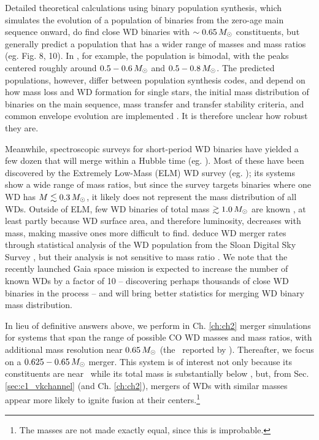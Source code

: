 Detailed theoretical calculations using binary population synthesis, which simulates the evolution of a population of binaries from the zero-age main sequence onward, do find close WD binaries with $\sim0.65\,\Msun$ constituents, but generally predict a population that has a wider range of masses and mass ratios (eg. \citealt{toon+14} Fig. 8, 10).  In \cite{toonnp12}, for example, the population is bimodal, with the peaks centered roughly around $0.5-0.6\,\Msun$ and $0.5-0.8\,\Msun$.  The predicted populations, however, differ between population synthesis codes, and depend on how mass loss and WD formation for single stars, the initial mass distribution of binaries on the main sequence, mass transfer and transfer stability criteria, and common envelope evolution are implemented \citep{toon+14, clae+14}.  It is therefore unclear how robust they are.

Meanwhile, spectroscopic surveys for short-period WD binaries have yielded a few dozen that will merge within a Hubble time (eg. \citealt{mars11, gian+15}).  Most of these have been discovered by the Extremely Low-Mass (ELM) WD survey (eg. \citealt{brow+10, gian+15}); its systems show a wide range of mass ratios, but since the survey targets binaries where one WD has $M\lesssim 0.3\,\Msun$, it likely does not represent the mass distribution of all WDs.  Outside of ELM, few WD binaries of total mass $\gtrsim1.0\,\Msun$ are known \citep{napi+07, mars11}, at least partly because WD surface area, and therefore luminosity, decreases with mass, making massive ones more difficult to find.  \cite{badem12} deduce WD merger rates through statistical analysis of the WD population from the Sloan Digital Sky Survey \citep{york+00}, but their analysis is not sensitive to mass ratio \citep{maozbb12}.  We note that the recently launched Gaia space mission \citep{carr+14, gaen+15} is expected to increase the number of known WDs by a factor of 10 -- discovering perhaps thousands of close WD binaries in the process -- and will bring better statistics for merging WD binary mass distribution.

In lieu of definitive answers above, we perform in Ch. \ref{ch:ch2} merger simulations for systems that span the range of possible CO WD masses and mass ratios, with additional mass resolution near $0.65\,\Msun$ (the \Mmean\ reported by \citealt{tremb09}).  Thereafter, we focus on a $0.625-0.65\,\Msun$ merger.  This system is of interest not only because its constituents are near \Mmean\ while its total mass is substantially below \Mch, but, from Sec. \ref{sec:c1_vkchannel} (and Ch. \ref{ch:ch2}), mergers of WDs with similar masses appear more likely to ignite fusion at their centers.\footnote{The masses are not made exactly equal, since this is improbable.}

